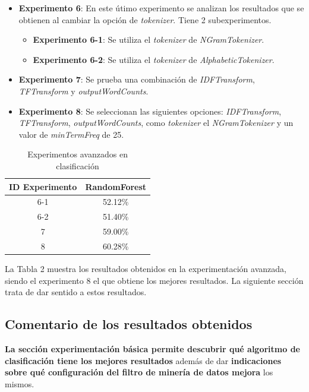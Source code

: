 \documentclass[12pt,a4paper, xcolor=table]{article}
\begin{document}
        \begin{itemize}
          \item \textbf{Experimento 6}: En este útimo experimento se analizan los resultados que se obtienen al cambiar la opción de \textit{tokenizer}. Tiene 2 subexperimentos.
          \begin{itemize}
            \item \textbf{Experimento 6-1}: Se utiliza el \textit{tokenizer} de \textit{NGramTokenizer}.
            \item \textbf{Experimento 6-2}: Se utiliza el \textit{tokenizer} de \textit{AlphabeticTokenizer}.
          \end{itemize}
          \item \textbf{Experimento 7}: Se prueba una combinación de \textit{IDFTransform}, \textit{TFTransform} y \textit{outputWordCounts}.
          \item \textbf{Experimento 8}: Se seleccionan las siguientes opciones: \textit{IDFTransform}, \textit{TFTransform}, \textit{outputWordCounts}, como \textit{tokenizer} el \textit{NGramTokenizer} y un valor de \textit{minTermFreq} de 25.
        \end{itemize}

        \begin{table}[h]
            \centering
            \begin{tabular}{|c|c|}
            \hline
            \rowcolor[HTML]{DAE8FC}
            \textbf{ID Experimento} & \textbf{RandomForest} \\ \hline
            6-1                     & 52.12\%               \\ \hline
            6-2                     & 51.40\%               \\ \hline
            7                       & 59.00\%               \\ \hline
            8                       & 60.28\%               \\ \hline
            \end{tabular}
            \caption{Experimentos avanzados en clasificación}
                \label{fig:graf_exp1}
        \end{table}

        La Tabla 2 muestra los resultados obtenidos en la experimentación avanzada, siendo el experimento 8 el que obtiene los mejores resultados. La siguiente sección trata de dar sentido a estos resultados.

    \subsection{Comentario de los resultados obtenidos}
    \textbf{ La sección experimentación básica permite descubrir qué algoritmo de clasificación tiene los mejores resultados} además de dar \textbf{indicaciones sobre qué configuración del filtro de minería de datos mejora} los mismos.
\end{document}
